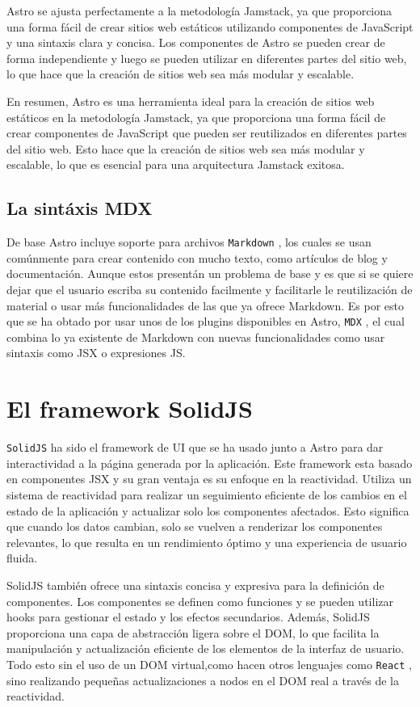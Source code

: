 Astro se ajusta perfectamente a la metodología Jamstack, ya que proporciona una forma fácil de crear sitios web estáticos utilizando componentes de JavaScript y una sintaxis clara y concisa. Los componentes de Astro se pueden crear de forma independiente y luego se pueden utilizar en diferentes partes del sitio web, lo que hace que la creación de sitios web sea más modular y escalable.

En resumen, Astro es una herramienta ideal para la creación de sitios web estáticos en la metodología Jamstack, ya que proporciona una forma fácil de crear componentes de JavaScript que pueden ser reutilizados en diferentes partes del sitio web. Esto hace que la creación de sitios web sea más modular y escalable, lo que es esencial para una arquitectura Jamstack exitosa.

\subsection{La sintáxis MDX}
De base Astro incluye soporte para archivos \verb|Markdown| \cite{md}, los cuales se usan comúnmente para crear contenido con mucho texto, como artículos de blog y documentación. Aunque estos presentán un problema de base y es que si se quiere dejar que el usuario escriba su contenido facilmente y facilitarle le reutilización de material o usar más funcionalidades de las que ya ofrece Markdown. Es por esto que se ha obtado por usar unos de los plugins disponibles en Astro, \verb|MDX| \cite{mdx}, el cual combina lo ya existente de Markdown con nuevas funcionalidades como usar sintaxis como JSX o expresiones JS.

\section{El framework SolidJS}
\verb|SolidJS| \cite{solidjs} ha sido el framework de UI que se ha usado junto a Astro para dar interactividad a la página generada por la aplicación. Este framework esta basado en componentes JSX y su gran ventaja es su enfoque en la reactividad. Utiliza un sistema de reactividad para realizar un seguimiento eficiente de los cambios en el estado de la aplicación y actualizar solo los componentes afectados. Esto significa que cuando los datos cambian, solo se vuelven a renderizar los componentes relevantes, lo que resulta en un rendimiento óptimo y una experiencia de usuario fluida.

SolidJS también ofrece una sintaxis concisa y expresiva para la definición de componentes. Los componentes se definen como funciones y se pueden utilizar hooks para gestionar el estado y los efectos secundarios. Además, SolidJS proporciona una capa de abstracción ligera sobre el DOM, lo que facilita la manipulación y actualización eficiente de los elementos de la interfaz de usuario. Todo esto sin el uso de un DOM virtual,como hacen otros lenguajes como \verb|React| \cite{react}, sino realizando pequeñas actualizaciones a nodos en el DOM real a través de la reactividad.

